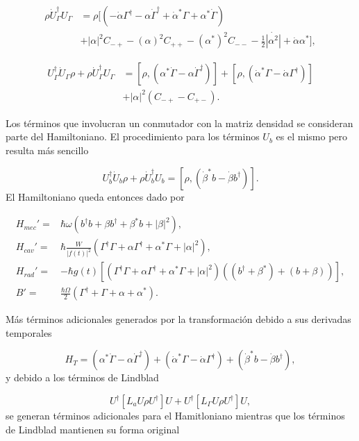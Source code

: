 \documentclass[10pt,a4paper]{report}
\begin{document}
\begin{align}
 \rho \dot{U}_\Gamma^\dagger U_\Gamma &= \rho[(-\dot{\alpha}\Gamma^\dagger - \alpha \dot{\Gamma}^\dagger + \dot{\alpha}^*\Gamma +\alpha^*\dot{\Gamma} ) \\
 &+ |\alpha|^2C_{-+} - (\alpha)^2C_{++} - (\alpha^*)^2 C_{--} - \frac{1}{2}\dot{|\alpha^2|} + \dot{\alpha}\alpha^*], \nonumber
\end{align}

\begin{align}
U_\Gamma^\dagger \dot{U}_\Gamma \rho + \rho \dot{U}_\Gamma^\dagger U_\Gamma &= [\rho, (\alpha^*\dot{\Gamma} - \alpha\dot{\Gamma}^\dagger)] + [\rho, (\dot{\alpha}^*\Gamma - \dot{\alpha}\Gamma^\dagger)] \\
&+|\alpha|^2 (C_{-+} - C_{+-}).
\end{align} 

Los términos que involucran un conmutador con la matriz densidad se consideran parte del Hamiltoniano. El procedimiento para los términos  $U_b$ es el mismo pero resulta más sencillo

\begin{equation}
U_b^\dagger \dot{U}_b \rho+ \rho \dot{U}_b^\dagger U_b = [\rho, (\dot{\beta}^*b - \dot{\beta}b^\dagger)].
\end{equation} El Hamiltoniano queda entonces dado por

\begin{align}
H_{mec}' =& \hbar \omega(b^{\dagger}b +\beta b^{\dagger}+\beta^* b + |\beta|^2),\\
H_{cav}' =& \hbar\frac{W}{|f(t)|^2}(\Gamma^{\dagger}\Gamma + \alpha \Gamma^{\dagger} + \alpha^* \Gamma + |\alpha|^2 ),\\
H_{rad}'=&-\hbar g(t)[(\Gamma^{\dagger}\Gamma + \alpha \Gamma^{\dagger} + \alpha^* \Gamma + |\alpha|^2 )((b^{\dagger}+\beta^*)+(b+\beta))],\\
B' =& \frac{\hbar \Omega}{2}(\Gamma^{\dagger} + \Gamma +\alpha + \alpha^*).
\end{align}

Más términos adicionales generados por la transformación debido a sus derivadas temporales

\begin{equation}
H_{T} = (\alpha^*\dot{\Gamma} - \alpha\dot{\Gamma}^\dagger) +(\dot{\alpha}^*\Gamma - \dot{\alpha}\Gamma^\dagger) +(\dot{\beta}^*b - \dot{\beta}b^\dagger),
\end{equation} y debido a los términos de Lindblad

\begin{equation}
U^\dagger [L_aU\rho U^\dagger]U + U^\dagger [L_\Gamma U\rho U^\dagger]U,
\end{equation} se generan términos adicionales para el Hamitloniano mientras que los términos de Lindblad mantienen su forma original
\end{document}

